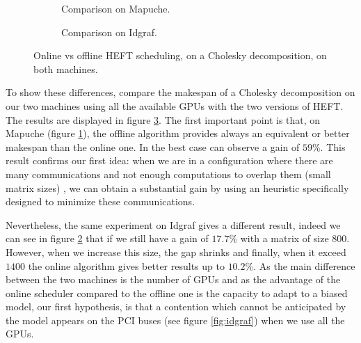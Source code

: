 \documentclass[10pt, conference, compsocconf,pdftex,dvipsnames]{IEEEtran}
\begin{document}
\begin{figure}[h!]
    \centering
    \begin{subfigure}{0.5\textwidth}
        \scalebox{0.65}{
            
        }
        \caption{Comparison on Mapuche.}
        \label{fig:OnOffMapuche}
    \end{subfigure}
    \begin{subfigure}{0.5\textwidth}
        \scalebox{0.65}{
            
        }
        \caption{Comparison on Idgraf.}
        \label{fig:OnOffIdgraf}
    \end{subfigure}
    \caption{Online vs offline HEFT scheduling, on a Cholesky decomposition, on both
    machines.}
    \label{fig:OnOff}
\end{figure}

To show these differences, compare the makespan of a Cholesky decomposition on
our two machines using all the available GPUs  with the two versions of HEFT.
The results are displayed in figure \ref{fig:OnOff}. The first important point
is that, on Mapuche (figure \ref{fig:OnOffMapuche}), the offline algorithm
provides always an equivalent or better makespan than the online one. In the
best case can observe a gain of $59\%$. This result confirms our first idea:
when we are in a configuration where there are many communications and not
enough computations to overlap them (small matrix sizes) , we can obtain a
substantial gain by using an heuristic specifically designed to minimize these
communications.

Nevertheless, the same experiment on Idgraf gives a different result, indeed
we can see in figure \ref{fig:OnOffIdgraf} that if we still have a gain of
$17.7\%$ with a matrix of size $800$. However, when we increase this size, the
gap shrinks and finally, when it exceed $1400$ the online algorithm gives
better results up to $10.2\%$. As the main difference between the two machines
is the number of GPUs and as the advantage of the online scheduler compared to
the offline one is the capacity to adapt to a biased model, our first
hypothesis, is that a contention which cannot be anticipated by the model
appears on the PCI buses (see figure \ref{fig:idgraf}) when we use all the
GPUs. 
\end{document}
